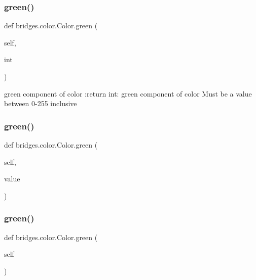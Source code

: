 \subsubsection{\texorpdfstring{green()}{green()}\hspace{0.1cm}{\footnotesize\ttfamily [1/3]}}
{\footnotesize\ttfamily def bridges.\+color.\+Color.\+green (\begin{DoxyParamCaption}\item[{}]{self,  }\item[{}]{int }\end{DoxyParamCaption})}

\begin{DoxyVerb}green component of color
:return int: green component of color
Must be a value between 0-255 inclusive
\end{DoxyVerb}
 \mbox{\label{classbridges_1_1color_1_1_color_a4c0826514c64b53910270336d357ad80}} 
\subsubsection{\texorpdfstring{green()}{green()}\hspace{0.1cm}{\footnotesize\ttfamily [2/3]}}
{\footnotesize\ttfamily def bridges.\+color.\+Color.\+green (\begin{DoxyParamCaption}\item[{}]{self,  }\item[{}]{value }\end{DoxyParamCaption})}

\mbox{\label{classbridges_1_1color_1_1_color_a86ec858a55491936054abcea865498ec}} 
\subsubsection{\texorpdfstring{green()}{green()}\hspace{0.1cm}{\footnotesize\ttfamily [3/3]}}
{\footnotesize\ttfamily def bridges.\+color.\+Color.\+green (\begin{DoxyParamCaption}\item[{}]{self }\end{DoxyParamCaption})}

